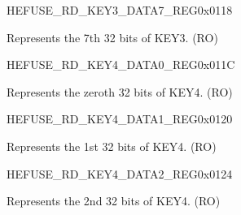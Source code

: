 \begin{register}{H}{EFUSE\_RD\_KEY3\_DATA7\_REG}{0x0118}\label{regdesc:EFUSERDKEY3DATA7REG}
%
\regnewline%
\begin{regdesc}\begin{reglist}
\label{fielddesc:EFUSEKEY3DATA7}\item [EFUSE\_KEY3\_DATA7] Represents the 7th 32 bits of KEY3. (RO)
\end{reglist}\end{regdesc}
\end{register}


\begin{register}{H}{EFUSE\_RD\_KEY4\_DATA0\_REG}{0x011C}\label{regdesc:EFUSERDKEY4DATA0REG}
%
\regnewline%
\begin{regdesc}\begin{reglist}
\label{fielddesc:EFUSEKEY4DATA0}\item [EFUSE\_KEY4\_DATA0] Represents the zeroth 32 bits of KEY4. (RO)
\end{reglist}\end{regdesc}
\end{register}


\begin{register}{H}{EFUSE\_RD\_KEY4\_DATA1\_REG}{0x0120}\label{regdesc:EFUSERDKEY4DATA1REG}
%
\regnewline%
\begin{regdesc}\begin{reglist}
\label{fielddesc:EFUSEKEY4DATA1}\item [EFUSE\_KEY4\_DATA1] Represents the 1st 32 bits of KEY4. (RO)
\end{reglist}\end{regdesc}
\end{register}


\begin{register}{H}{EFUSE\_RD\_KEY4\_DATA2\_REG}{0x0124}\label{regdesc:EFUSERDKEY4DATA2REG}
%
\regnewline%
\begin{regdesc}\begin{reglist}
\label{fielddesc:EFUSEKEY4DATA2}\item [EFUSE\_KEY4\_DATA2] Represents the 2nd 32 bits of KEY4. (RO)
\end{reglist}\end{regdesc}
\end{register}


